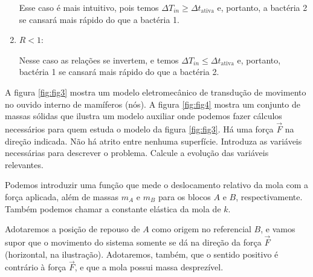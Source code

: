 \documentclass[]{IMTexam}
\begin{document}
\begin{questions}
\begin{parts}
\begin{solution}
\begin{enumerate}
				      Esse caso é mais intuitivo, pois temos $ \Delta T_{in}\geqslant\Delta t_{\text{ativa}} $ e, portanto, a bactéria 2 se cansará mais rápido do que a bactéria 1.

				\item $ R<1 $:

				      Nesse caso as relações se invertem, e temos $ \Delta T_{in}\leqslant\Delta t_{\text{ativa}} $ e, portanto, bactéria 1 se cansará mais rápido do que a bactéria 2.
			\end{enumerate}
		\end{solution}
	\end{parts}

	\question A figura \ref{fig:fig3} mostra um modelo eletromecânico de transdução de movimento no ouvido interno de mamíferos (nós). A figura \ref{fig:fig4} mostra um conjunto de massas sólidas que ilustra um modelo auxiliar onde podemos fazer cálculos necessários para quem estuda o modelo da figura \ref{fig:fig3}. Há uma força $\vec{F}$ na direção indicada. Não há atrito entre nenhuma superfície. Introduza as variáveis necessárias para descrever o problema. Calcule a evolução das variáveis relevantes.

	\begin{solution}

		\begin{multi}
			Podemos introduzir uma função que mede o deslocamento relativo da mola com a força aplicada, além de massas $ m_A $ e $ m_B $ para os blocos $ A $ e $ B $, respectivamente. Também podemos chamar a constante elástica da mola de $ k $.

			Adotaremos a posição de repouso de $ A $ como origem no referencial $ B $, e vamos supor que o movimento do sistema somente se dá na direção da força $ \vec{F} $ (horizontal, na ilustração). Adotaremos, também, que o sentido positivo é contrário à força $ \vec{F} $, e que a mola possui massa desprezível.

			\nextcol

			\centering
\end{multi}
\end{solution}
\end{questions}
\end{document}
